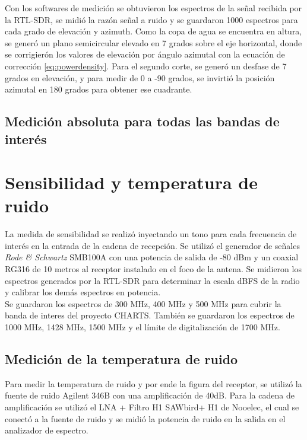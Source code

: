 Con los softwares de medición se obtuvieron los espectros de la señal recibida por la RTL-SDR, se midió la razón señal a ruido y se guardaron 1000 espectros para cada grado de elevación y azimuth. Como la copa de agua se encuentra en altura, se generó un plano semicircular elevado en 7 grados sobre el eje horizontal, donde se corrigierón los valores de elevación por ángulo azimutal con la ecuación de corrección \ref{eq:powerdensity}. Para el segundo corte, se generó un desfase de 7 grados en elevación, y para medir de 0 a -90 grados, se invirtió la posición azimutal en 180 grados para obtener ese cuadrante.\\

\subsection{Medición absoluta para todas las bandas de interés}

\section{Sensibilidad y temperatura de ruido}

La medida de sensibilidad se realizó inyectando un tono para cada frecuencia de interés en la entrada de la cadena de recepción. Se utilizó el generador de señales \textit{Rode \& Schwartz} SMB100A con una potencia de salida de -80 dBm y un coaxial RG316 de 10 metros al receptor instalado en el foco de la antena. Se midieron los espectros generados por la RTL-SDR para determinar la escala dBFS de la radio y calibrar los demás espectros en potencia.\\

Se guardaron los espectros de 300 MHz, 400 MHz y 500 MHz para cubrir la banda de interes del proyecto CHARTS. También se guardaron los espectros de 1000 MHz, 1428 MHz, 1500 MHz y el límite de digitalización de 1700 MHz.\\

\subsection{Medición de la temperatura de ruido}

Para medir la temperatura de ruido y por ende la figura del receptor, se utilizó la fuente de ruido Agilent 346B con una amplificación de 40dB. Para la cadena de amplificación se utilizó el LNA + Filtro H1 SAWbird+ H1 de Nooelec, el cual se conectó a la fuente de ruido y se midió la potencia de ruido en la salida en el analizador de espectro.\\

